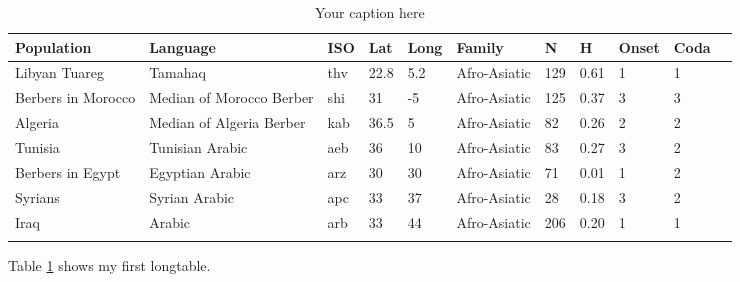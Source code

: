 \documentclass{article}
\begin{document}
\begin{longtable}{| p{} | p{} | p{} | p{} | p{} | p{} | p{} | p{} | p{} | p{} |p{} } 
  \hline
Population & Language & ISO & Lat & Long & Family & N & H & Onset & Coda \\ 
  \hline
Libyan Tuareg & Tamahaq & thv & 22.8 & 5.2 & Afro-Asiatic & 129 & 0.61 & 1 & 1 \\ 
  Berbers in Morocco & Median of Morocco Berber & shi & 31 & -5 & Afro-Asiatic & 125 & 0.37 & 3 & 3 \\ 
  Algeria & Median of Algeria Berber & kab & 36.5 & 5 & Afro-Asiatic & 82 & 0.26 & 2 & 2 \\ 
  Tunisia & Tunisian Arabic & aeb & 36 & 10 & Afro-Asiatic & 83 & 0.27 & 3 & 2 \\ 
  Berbers in Egypt & Egyptian Arabic & arz & 30 & 30 & Afro-Asiatic & 71 & 0.01 & 1 & 2 \\ 
  Syrians & Syrian Arabic & apc & 33 & 37 & Afro-Asiatic & 28 & 0.18 & 3 & 2 \\ 
  Iraq & Arabic & arb & 33 & 44 & Afro-Asiatic & 206 & 0.20 & 1 & 1 \\ 
   \hline
\caption{Your caption here} %
\label{tab:myfirstlongtable}
\end{longtable}

Table \ref{tab:myfirstlongtable} shows my first longtable.
\end{document}
